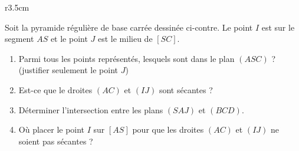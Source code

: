 
\begin{exercice}[\ldots/4]\label{exosmath-0700}

\begin{wrapfigure}{r}{3.5cm}
   \vspace{-0.5cm}        %
   \centering
   
\end{wrapfigure}

        Soit la pyramide régulière de base carrée dessinée ci-contre. Le point \( I\) est sur le segment \( AS\) et le point \( J\) est le milieu de \( [SC]\).
        \begin{enumerate}
            \item
                Parmi tous les points représentés, lesquels sont dans le plan \( (ASC)\) ? (justifier seulement le point \( J\))
            \item
                Est-ce que le droites \( (AC)\) et \( (IJ)\) sont sécantes ?
            \item
                Déterminer l'intersection entre les plans \( (SAJ)\) et \( (BCD)\).
            \item
                Où placer le point \( I\) sur \( [AS]\) pour que les droites \( (AC)\) et \( (IJ)\) ne soient pas sécantes ?
        \end{enumerate}


\end{exercice}
